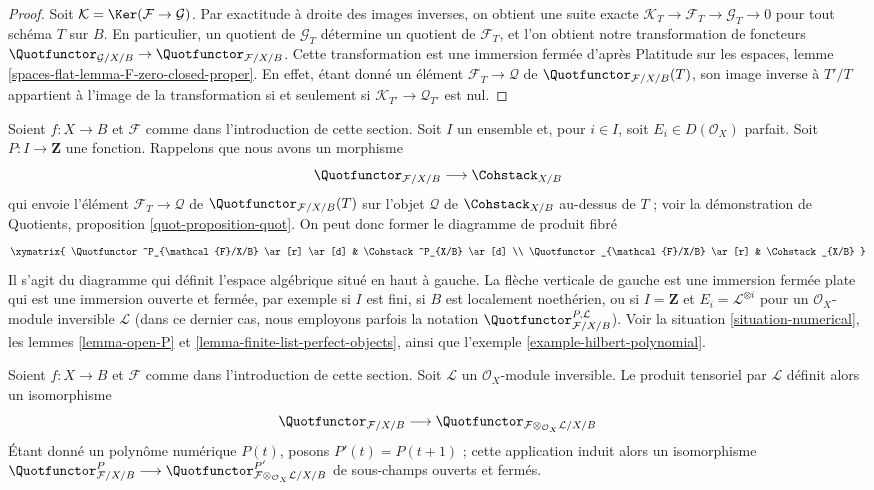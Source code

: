 \begin{proof}
Soit $\mathcal{K} = \Ker(\mathcal{F} \to \mathcal{G})$.
Par exactitude à droite des images inverses, on obtient une suite exacte
$\mathcal{K}_T \to \mathcal{F}_T \to \mathcal{G}_T \to 0$
pour tout schéma $T$ sur $B$.
En particulier, un quotient de $\mathcal{G}_T$ détermine un quotient de
$\mathcal{F}_T$, et l'on obtient notre transformation de foncteurs
$\Quotfunctor_{\mathcal{G}/X/B} \to
\Quotfunctor_{\mathcal{F}/X/B}$.
Cette transformation est une immersion fermée d'après Platitude sur les
espaces, lemme \ref{spaces-flat-lemma-F-zero-closed-proper}.
En effet, étant donné un élément $\mathcal{F}_T \to \mathcal{Q}$ de
$\Quotfunctor_{\mathcal{F}/X/B}(T)$, son image inverse à $T'/T$ appartient
à l'image de la transformation si et seulement si
$\mathcal{K}_{T'} \to \mathcal{Q}_{T'}$ est nul.
\end{proof}

\begin{remark}
\label{remark-quot-numerical}
Soient $f : X \to B$ et $\mathcal{F}$ comme dans l'introduction de cette
section. Soit $I$ un ensemble et, pour $i \in I$, soit
$E_i \in D(\mathcal{O}_X)$ parfait. Soit $P : I \to \mathbf{Z}$ une
fonction. Rappelons que nous avons un morphisme
$$
\Quotfunctor_{\mathcal{F}/X/B} \longrightarrow \Cohstack_{X/B}
$$
qui envoie l'élément $\mathcal{F}_T \to \mathcal{Q}$ de
$\Quotfunctor_{\mathcal{F}/X/B}(T)$ sur l'objet $\mathcal{Q}$ de
$\Cohstack_{X/B}$ au-dessus de $T$ ; voir la démonstration de Quotients,
proposition \ref{quot-proposition-quot}. On peut donc former le diagramme
de produit fibré
$$
\xymatrix{
\Quotfunctor^P_{\mathcal{F}/X/B} \ar[r] \ar[d] &
\Cohstack^P_{X/B} \ar[d] \\
\Quotfunctor_{\mathcal{F}/X/B} \ar[r] &
\Cohstack_{X/B}
}
$$
Il s'agit du diagramme qui définit l'espace algébrique situé en haut à
gauche. La flèche verticale de gauche est une immersion fermée plate qui
est une immersion ouverte et fermée, par exemple si $I$ est fini, si $B$
est localement noethérien, ou si $I = \mathbf{Z}$ et
$E_i = \mathcal{L}^{\otimes i}$ pour un $\mathcal{O}_X$-module inversible
$\mathcal{L}$ (dans ce dernier cas, nous employons parfois la notation
$\Quotfunctor^{P, \mathcal{L}}_{\mathcal{F}/X/B}$).
Voir la situation \ref{situation-numerical}, les lemmes
\ref{lemma-open-P} et \ref{lemma-finite-list-perfect-objects}, ainsi que
l'exemple \ref{example-hilbert-polynomial}.
\end{remark}

\begin{lemma}
\label{lemma-quot-tensor-invertible}
Soient $f : X \to B$ et $\mathcal{F}$ comme dans l'introduction de cette
section. Soit $\mathcal{L}$ un $\mathcal{O}_X$-module inversible.
Le produit tensoriel par $\mathcal{L}$ définit alors un isomorphisme
$$
\Quotfunctor_{\mathcal{F}/X/B}
\longrightarrow
\Quotfunctor_{\mathcal{F} \otimes_{\mathcal{O}_X} \mathcal{L}/X/B}
$$
Étant donné un polynôme numérique $P(t)$, posons $P'(t) = P(t + 1)$ ;
cette application induit alors un isomorphisme
$\Quotfunctor^P_{\mathcal{F}/X/B}
\longrightarrow
\Quotfunctor^{P'}_{\mathcal{F} \otimes_{\mathcal{O}_X} \mathcal{L}/X/B}$
de sous-champs ouverts et fermés.
\end{lemma}


